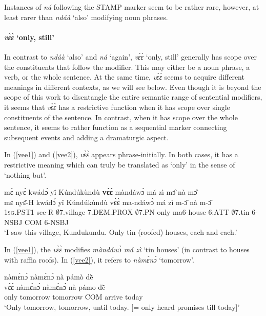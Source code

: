 \noindent Instances of {\itshape ná} following the STAMP marker seem to be rather rare, however, at least rarer than {\itshape ndáà} `also' modifying noun phrases. 



\paragraph{{\itshape vɛ̀ɛ̀} `only, still'} 
In contrast to {\itshape ndáà} `also' and {\itshape ná} `again', {\itshape vɛ̀ɛ̀} `only, still' generally has scope over the constituents that follow the modifier. This may either be a noun phrase, a verb, or the whole sentence. At the same time, {\itshape vɛ̀ɛ̀} seems to acquire different meanings in different contexts, as we will see below. Even though it is beyond the scope of this work to disentangle the entire semantic range of sentential modifiers, it seems that {\itshape vɛ̀ɛ̀} has a restrictive function when it has scope over single constituents of the sentence. In contrast, when it has scope over the whole sentence, it seems to rather function as a sequential marker connecting subsequent events and adding a dramaturgic aspect.


In (\ref{vee1}) and (\ref{vee2}), {\itshape vɛ̀ɛ̀} appears phrase-initially. In both cases, it has a restrictive meaning which can truly be translated as `only' in the sense of `nothing but'.

\begin{exe} 
\ex\label{vee1} 
  \glll  mɛ̀ nyɛ́ kwádɔ́ yî Kúndúkùndù {\bfseries vɛ̀ɛ̀} màndáwɔ̀ má zì mɔ̂ nà mɔ̂ \\
         mɛ nyɛ̂-H kwádɔ́ yî Kúndúkùndù vɛ̀ɛ̀ ma-ndáwɔ̀ má zì m-ɔ̂ nà m-ɔ̂ \\
            1\textsc{sg}.PST1 see-R $\emptyset$7.village 7.DEM.PROX $\emptyset$7.PN only ma6-house 6:ATT $\emptyset$7.tin 6-NSBJ COM 6-NSBJ  \\
    \trans `I saw this village, Kundukundu. Only tin (roofed) houses, each and each.'
\end{exe}

In (\ref{vee1}), the {\itshape vɛ̀ɛ̀} modifies {\itshape màndáwɔ̀ má zì} `tin houses' (in contrast to houses with raffia roofs). In (\ref{vee2}), it refers to {\itshape nàmɛ́nɔ́} `tomorrow'.

\begin{exe} 
\ex\label{vee2}
   nàmɛ́nɔ́ nàmɛ́nɔ́ nà pámò dẽ̀ \\
       vɛ̀ɛ̀ nàmɛ́nɔ́ nàmɛ́nɔ́ nà pámo dẽ̀ \\
            only tomorrow tomorrow COM arrive today \\
    \trans `Only tomorrow, tomorrow, until today. [= only heard promises till today]'
\end{exe}


